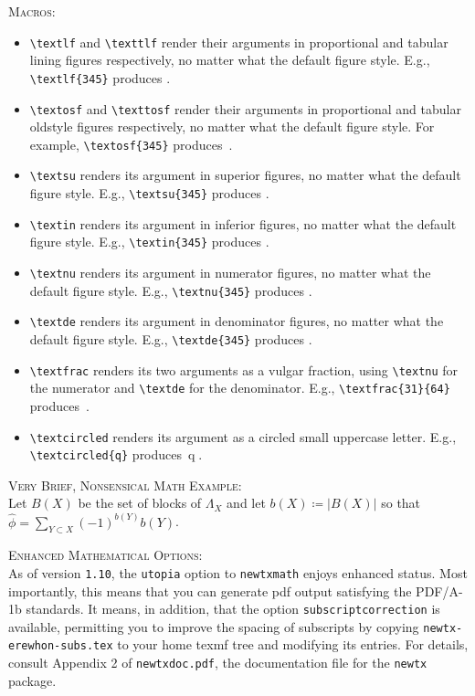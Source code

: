 \documentclass[11pt]{amsart}
\begin{document}
\textsc{Macros:}
\begin{itemize}
\item
\verb|\textlf| and \verb|\texttlf| render their arguments in proportional and tabular lining figures respectively, no matter what the default figure style. E.g., \verb|\textlf{345}| produces .
\item
\verb|\textosf| and \verb|\texttosf| render their arguments in proportional and tabular oldstyle figures respectively, no matter what the default figure style. For example, \verb|\textosf{345}| produces~.
\item
\verb|\textsu|  renders its argument in superior figures, no matter what the default figure style. E.g., \verb|\textsu{345}| produces .
\item
\verb|\textin|  renders its argument in inferior figures, no matter what the default figure style. E.g., \verb|\textin{345}| produces .
\item
\verb|\textnu|  renders its argument in numerator figures, no matter what the default figure style. E.g., \verb|\textnu{345}| produces .
\item
\verb|\textde|  renders its argument in denominator figures, no matter what the default figure style. E.g., \verb|\textde{345}| produces .
\item
\verb|\textfrac|  renders its two arguments as a vulgar fraction, using \verb|\textnu| for the numerator and \verb|\textde| for the denominator. E.g., \verb|\textfrac{31}{64}| produces~.
\item
\verb|\textcircled|  renders its argument as a circled small uppercase letter. E.g., \verb|\textcircled{q}| produces~\textcircled{q}.
\end{itemize}
\textsc{Very Brief, Nonsensical Math Example:}\\
Let $B(X)$ be the set of blocks of $\Lambda_{X}$
and let $b(X) \coloneq |{B(X)}|$ so that $\hat\phi=\sum_{Y\subset X}(-1)^{b(Y)}b(Y)$. 

\textsc{Enhanced Mathematical Options:}\\
As of version {\tt 1.10}, the {\tt utopia} option to {\tt newtxmath} enjoys enhanced status. Most importantly, this means that you can generate pdf output satisfying the PDF/A-1b standards. It means, in addition, that the option {\tt subscriptcorrection} is available, permitting you to improve the spacing of subscripts by copying {\tt newtx-erewhon-subs.tex} to your home texmf tree and modifying its entries. For details, consult Appendix 2 of {\tt newtxdoc.pdf}, the documentation file for the {\tt newtx} package.
\end{document}
